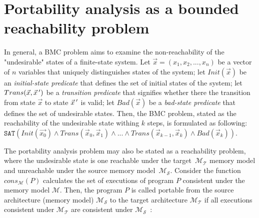 

\section{Portability analysis as a bounded reachability problem}
\label{ch:port:enc}


In general, a BMC problem aims to examine the non-reachability of the "undesirable" states of a finite-state system.
Let $\vec{x} = (x_1, x_2, ..., x_n)$ be a vector of $n$ variables that uniquely distinguishes states of the system; let $Init(\vec{x})$ be an \textit{initial-state predicate} that defines the set of initial states of the system; let $Trans(\vec{x}, \vec{x}\,')$ be a \textit{transition predicate} that signifies whether there the transition from state $\vec{x}$ to state $\vec{x}\,'$ is valid; let $Bad(\vec{x})$ be a \textit{bad-state predicate} that defines the set of undesirable states.
Then, the BMC problem, stated as the reachability of the undesirable state withing $k$ steps, is formulated as following:
$\mathtt{SAT}( Init(\vec{x_0}) \land Trans(\vec{x}_0, \vec{x}_1) \land ... \land Trans(\vec{x}_{k-1}, \vec{x}_k) \land Bad(\vec{x}_k) )$.

The portability analysis problem may also be stated as a reachability problem, where the undesirable state is one reachable under the target~$\mathcal{M_T}$ memory model and unreachable under the source memory model~$\mathcal{M_S}$.
Consider the function $cons_{\mathcal{M}}(P)$ calculates the set of executions of program $P$ consistent under the memory model $\mathcal{M}$. Then, the program $P$ is called portable from the source architecture (memory model) $\mathcal{M_S}$ to the target architecture $\mathcal{M_T}$ if all executions consistent under $\mathcal{M_T}$ are consistent under $\mathcal{M_S}$~\cite{Porthos17a}:


